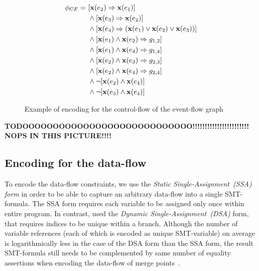 \begin{figure}
\begin{minipage}{.4\textwidth}
\centering
{}
\end{minipage}
%
\begin{minipage}{.6\textwidth}
\centering
\begin{align*}
\phi_{CF} = \ & [\mathbf{x}(e_2) \Rightarrow \mathbf{x}(e_1)] \\
                 \ & \land [\mathbf{x}(e_3) \Rightarrow \mathbf{x}(e_2)] \\
                 \ & \land [\mathbf{x}(e_4) \Rightarrow (\mathbf{x}(e_1) \lor \mathbf{x}(e_2) \lor \mathbf{x}(e_3))] \\
                 \ & \land [\mathbf{x}(e_1) \land \mathbf{x}(e_2) \Rightarrow g_{1,2}] \\
                 \ & \land [\mathbf{x}(e_1) \land \mathbf{x}(e_4) \Rightarrow g_{1,4}] \\
                 \ & \land [\mathbf{x}(e_2) \land \mathbf{x}(e_3) \Rightarrow g_{2,3}] \\
                 \ & \land [\mathbf{x}(e_2) \land \mathbf{x}(e_4) \Rightarrow g_{2,4}] \\
                 \ & \land \lnot [\mathbf{x}(e_2) \land \mathbf{x}(e_4)] \\
                 \ & \land \lnot [\mathbf{x}(e_3) \land \mathbf{x}(e_4)]
\end{align*}
\end{minipage}
\caption{Example of encoding for the control-flow of the event-flow graph}
\label{fig:graph-example}
\end{figure}

\textbf{TODOOOOOOOOOOOOOOOOOOOOOOOOOOOO!!!!!!!!!!!!!!!!!!!!!!! NOPS IN THIS PICTURE!!!!}


\subsection{Encoding for the data-flow}
\label{ch:enc:bmc:df}

To encode the data-flow constraints, we use the \textit{Static Single-Assignment~(SSA) form} in order to be able to capture an arbitrary data-flow into a single SMT-formula.
The SSA form requires each variable to be assigned only once within entire program.
In contrast, \porthos{} used the \textit{Dynamic Single-Assignment~(DSA)} form, that requires indices to be unique within a branch.
Although the number of variable references (each of which is encoded as unique SMT-variable) on average is logarithmically less in the case of the DSA form than the SSA form, the result SMT-formula still needs to be complemented by same number of equality assertions when encoding the data-flow of merge points~\cite{Porthos17a}.

